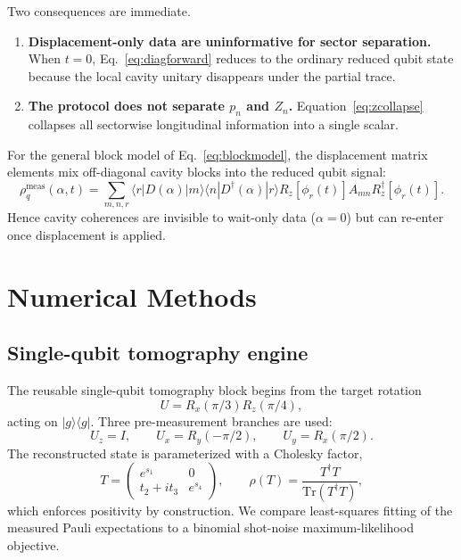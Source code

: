 \documentclass[11pt]{article}
\begin{document}
Two consequences are immediate.
\begin{enumerate}[label=\alph*)]
\item \textbf{Displacement-only data are uninformative for sector separation.}
When $t=0$, Eq.~\eqref{eq:diagforward} reduces to the ordinary reduced qubit
state because the local cavity unitary disappears under the partial trace.
\item \textbf{The protocol does not separate $p_n$ and $Z_n$.}
Equation~\eqref{eq:zcollapse} collapses all sectorwise longitudinal information
into a single scalar.
\end{enumerate}

For the general block model of Eq.~\eqref{eq:blockmodel}, the displacement
matrix elements mix off-diagonal cavity blocks into the reduced qubit signal:
\begin{equation}
\rho_q^{\mathrm{meas}}(\alpha,t)=
\sum_{m,n,r}
\langle r|D(\alpha)|m\rangle
\langle n|D^\dagger(\alpha)|r\rangle
R_z[\phi_r(t)]A_{mn}R_z^\dagger[\phi_r(t)].
\label{eq:blockforward}
\end{equation}
Hence cavity coherences are invisible to wait-only data ($\alpha=0$) but can
re-enter once displacement is applied.

\section{Numerical Methods}
\subsection{Single-qubit tomography engine}
The reusable single-qubit tomography block begins from the target rotation
\begin{equation}
U = R_x(\pi/3)R_z(\pi/4),
\end{equation}
acting on $|g\rangle\langle g|$. Three pre-measurement branches are used:
\begin{equation}
U_z = I,\qquad
U_x = R_y(-\pi/2),\qquad
U_y = R_x(\pi/2).
\end{equation}
The reconstructed state is parameterized with a Cholesky factor,
\begin{equation}
T =
\begin{pmatrix}
e^{s_1} & 0 \\
t_2 + i t_3 & e^{s_4}
\end{pmatrix},
\qquad
\rho(T)=\frac{T^\dagger T}{\mathrm{Tr}(T^\dagger T)},
\end{equation}
which enforces positivity by construction. We compare least-squares fitting of
the measured Pauli expectations to a binomial shot-noise maximum-likelihood
objective.
\end{document}

